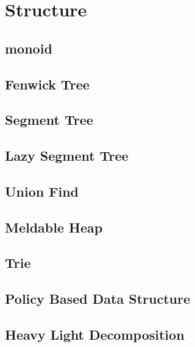 \section{Structure}

\subsection{monoid}


\subsection{Fenwick Tree}


\subsection{Segment Tree}


\subsection{Lazy Segment Tree}





\subsection{Union Find}


\subsection{Meldable Heap}


\subsection{Trie}


\subsection{Policy Based Data Structure}


\subsection{Heavy Light Decomposition}

